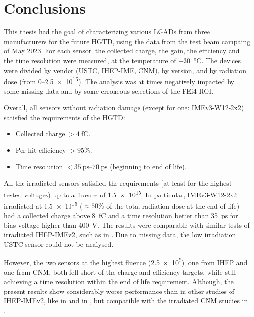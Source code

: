 \chapter*{Conclusions}\label{chap:conclusion}


This thesis had the goal of characterizing various LGADs from three manufacturers for the future HGTD, using the data from the test beam campaing of May 2023. For each sensor, the collected charge, the gain, the efficiency and the time resolution were measured, at the temperature of \qty{-30}{\degreeCelsius}. The devices were divided by vendor (USTC, IHEP-IME, CNM), by version, and by radiation dose (from \qtyrange{0}{2.5e15}{\neutroneq}). The analysis was at times negatively impacted by some missing data and by some erroneous selections of the FEi4 ROI.

Overall, all sensors without radiation damage (except for one: IMEv3-W12-2x2) satisfied the requirements of the HGTD:
\begin{itemize}
    \item Collected charge \(>\qty{4}{\femto\coulomb}\).
    \item Per-hit efficiency \(>95\%\).
    \item Time resolution \(<\qtyrange{35}{70}{\pico\second}\) (beginning to end of life).
\end{itemize}

All the irradiated sensors satisfied the requirements (at least for the highest tested voltages) up to a fluence of \qty{1.5e15}{\neutroneq}. In particular, IMEv3-W12-2x2 irradiated at \qty{1.5e15}{\neutroneq} (\(\approx60\%\) of the total radiation dose at the end of life) had a collected charge above \qty{8}{\femto\coulomb} and a time resolution better than \qty{35}{\pico\second} for bias voltage higher than \qty{400}{\volt}. The results were comparable with similar tests of irradiated IHEP-IMEv2, such as in \cite{Ali:2023roa}. Due to missing data, the low irradiation USTC sensor could not be analysed.

However, the two sensors at the highest fluence (\qty{2.5e5}{\neutroneq}), one from IHEP and one from CNM, both fell short of the charge and efficiency targets, while still achieving a time resolution within the end of life requirement. Although, the present results show considerably worse performance than in other studies of IHEP-IMEv2, like in \cite{Ali:2023roa} and in \cite{Wu:2022ruu}, but compatible with the irradiated CNM studies in \cite{Agapopoulou_2022}. 

